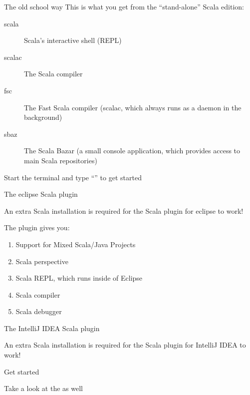 \begin{frame}{The old school way}
This is what you get from the ``stand-alone'' Scala edition:
\begin{description}
  \item[scala] Scala's interactive shell (REPL)
  \item[scalac] The Scala compiler
  \item[fsc] The Fast Scala compiler (scalac, which always runs as a daemon in
  the background)
  \item[sbaz] The Scala Bazar (a small console application, which provides
  access to main Scala repositories)
\end{description}
\begin{center}
Start the terminal and type ``'' to get started
\end{center}
\end{frame}

\begin{frame}{The eclipse Scala plugin}
\begin{center}
\end{center}
\begin{center}
An extra Scala installation is  required for the Scala
plugin for eclipse to work!
\end{center}
The plugin gives you:
\begin{enumerate}
  \item Support for Mixed Scala/Java Projects
  \item Scala perspective
  \item Scala REPL, which runs inside of Eclipse
  \item Scala compiler
  \item Scala debugger
\end{enumerate}
\end{frame}

\begin{frame}{The IntelliJ IDEA Scala plugin}
\begin{center}
\end{center}
\begin{center}
An extra Scala installation \alert{is} required for the Scala
plugin for IntelliJ IDEA to work!
\end{center}
\begin{center}
Get started 
\end{center}
\begin{center}
Take a look at the  as well
\end{center}
\end{frame}

